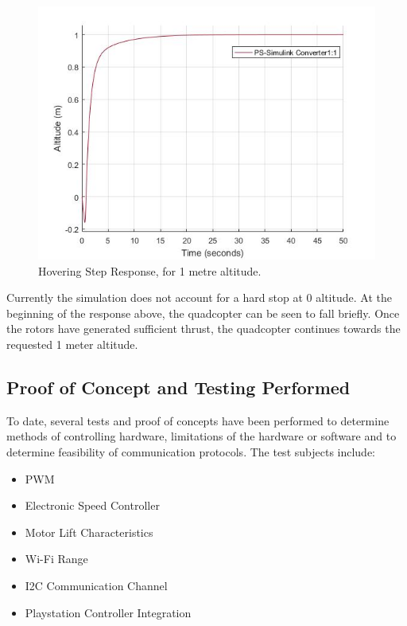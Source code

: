 \begin{figure}[h]
	\centering
	\includegraphics[scale = 0.5]{stepresponse.jpg}
	\caption{Hovering Step Response, for 1 metre altitude.}
	\label{fig:1m_step}
\end{figure}

Currently the simulation does not account for a hard stop at 0 altitude.  At the beginning of the response above, the quadcopter can be seen to fall briefly.  Once the rotors have generated sufficient thrust, the quadcopter continues towards the requested 1 meter altitude.

  \subsection{Proof of Concept and Testing Performed}
  
  To date, several tests and proof of concepts have been performed to determine methods of controlling hardware, limitations of the hardware or software and to determine feasibility of communication protocols. The test subjects include:
  
\begin{itemize}
  \item{PWM}
  \item{Electronic Speed Controller}
  \item{Motor Lift Characteristics}
  \item{Wi-Fi Range}
  \item{I2C Communication Channel}
  \item{Playstation Controller Integration}
 \end{itemize}
  
